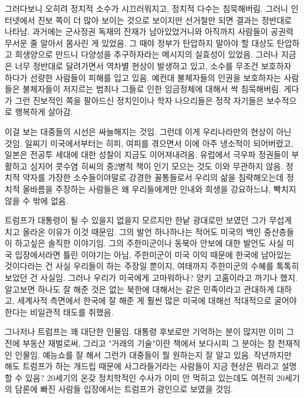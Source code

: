 그러다보니 오히려 정치적 소수가 시끄러워지고, 정치적 다수는 침묵해버림.
그러니 인터넷에서 진보 쪽이 더 많아 보이는 것으로 보이지만 선거철만 되면 결과는 정반대로 나타남.
과거에는 군사정권 독재의 잔재가 남아있었거니와 아직까지 사람들이 공권력 무서운 줄 알아서 몸사린 게 있었음.
그 때야 정부가 탄압하지 말아야 할 대상도 탄압하고 희생양으로 만드니 다양성을 추구하자라는 메시지의 실효성이 있었음.
그러나 지금은 너무 정반대로 달려가면서 역차별 현상이 발생하고 있고, 소수를 무조건 보호하자 하다가 선량한 사람들이 피해를 입고 있음.
예컨대 불체자들의 인권을 보호하자는 사람들은 불체자들이 저지르는 범죄나 그들로 인한 임금정체에 대해서 싹 침묵해버림.
게다가 그런 진보적인 쪽을 팔아드신 정치인이나 학자 나으리들은 정작 자기들은 보수적으로 행복하게 살아감.
\vspace{5mm}

이걸 보는 대중들의 시선은 싸늘해지는 것임. 그런데 이게 우리나라만의 현상이 아닌 것임.
일찌기 미국에서부터는 히피, 여피를 겪으면서 이에 아주 냉소적이 되어버렸고, 일본은 전공투 세대에 대한 성찰이 지금도 이어져내려옴.
유럽에서 극우파 정권들이 부활하고 심지어 콧수염 히씨의 중2병적 책이 인기 모으는 것도 이와 무관하지 않음.
정치적 약자를 가장한 소수들이야말로 강경한 꼴통들로서 우리의 삶을 침략해오는데 정치적 올바름을 주장하는 사람들은
왜 우리들에게만 인내와 희생을 강요하느냐, 빡치지 않을 수 밖에 없음.
\vspace{5mm}

트럼프가 대통령이 될 수 있을지 없을지 모르지만 한낱 광대로만 보였던 그가 무섭게 치고 올라온 이유가 이것 때문임.
그의 발언 하나하나는 적어도 미국의 백인 중산층들이 하고싶은 솔직한 이야기임.
그의 주한미군이나 동북아 안보에 대한 발언도 사실 미국 입장에서라면 틀린 이야기는 아님,
주한미군이 미국 이익 때문에 한국에 남아있는 것이다라는 건 사실 우리들이 하는 주장일 뿐이지,
여태까지 주한미군의 수혜를 톡톡히 보았던 건 사실임. 그러나 우리가 미국에게 고마워하나? 양키 고홈이라고 까기나 했지.
알고보면 하나도 잘 해준 것은 없는 북한에 대해서는 같은 민족이라고 관대하게 대하고,
세계사적 측면에서 한국에 잘 해준 게 훨씬 많은 미국에 대해선 적대적으로 굴어야한다는 비일관적 태도를 취했음.
\vspace{5mm}

그나저나 트럼프는 꽤 대단한 인물임. 대통령 후보로만 기억하는 분이 많지만
이미 그 전에 부동산 재벌로써, 그리고 "거래의 기술"이란 책에서 보다시피 그 분야는 참 천재적인 인물임.
예능쇼를 잘 해서 그런가  대중들이 뭘 원하는지 잘 알고 있음.
작년까지만 해도 트럼프가 하는 개드립 때문에 사그라들거라는 사람들이 지금 현상은 뭐라고 설명할 수 있음?
20세기의 온갖 정치학적인 수사가 이미 안 먹히고 있는데도 여전히 20세기의 담론에 빠진 사람들 입장에서는 트럼프가 광인으로 보였을 것임.
\vspace{5mm}

